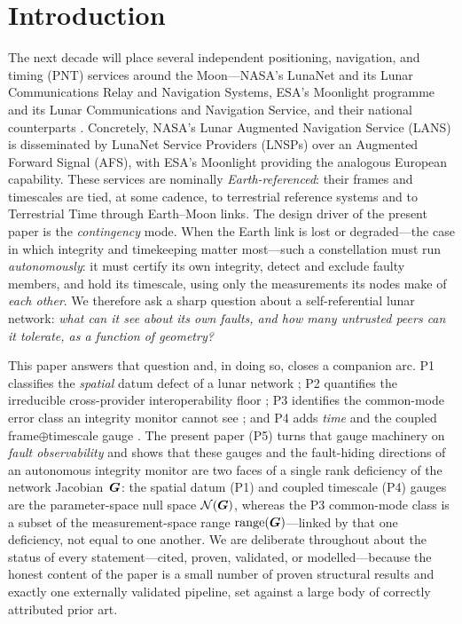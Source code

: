 \section{Introduction}
\label{sec:intro}

The next decade will place several independent positioning, navigation, and timing (PNT)
services around the Moon---NASA's LunaNet and its Lunar Communications Relay and Navigation
Systems, ESA's Moonlight programme and its Lunar Communications and Navigation Service, and
their national counterparts \citep{israel2020lunanet,fienga2024moonlight,lnis2023}. Concretely,
NASA's Lunar Augmented Navigation Service (LANS) is disseminated by LunaNet Service Providers
(LNSPs) over an Augmented Forward Signal (AFS), with ESA's Moonlight providing the analogous
European capability. These
services are nominally \emph{Earth-referenced}: their frames and timescales are tied, at
some cadence, to terrestrial reference systems and to Terrestrial Time through Earth--Moon
links. The design driver of the present paper is the \emph{contingency} mode. When the
Earth link is lost or degraded---the case in which integrity and timekeeping matter
most---such a constellation must run \emph{autonomously}: it must certify its own integrity,
detect and exclude faulty members, and hold its timescale, using only the measurements its
nodes make of \emph{each other}. We therefore ask a sharp question about a self-referential
lunar network: \emph{what can it see about its own faults, and how many untrusted peers can
it tolerate, as a function of geometry?}

This paper answers that question and, in doing so, closes a companion arc. P1 classifies the
\emph{spatial} datum defect of a lunar network \citep{baweja2026datum}; P2 quantifies the
irreducible cross-provider interoperability floor \citep{baweja2026interop}; P3 identifies
the common-mode error class an integrity monitor cannot see \citep{baweja2026commonmode};
and P4 adds \emph{time} and the coupled frame$\oplus$timescale gauge \citep{baweja2026gauge}.
The present paper (P5) turns that gauge machinery on \emph{fault observability} and shows
that these gauges and the fault-hiding directions of an autonomous integrity monitor are two
faces of a single rank deficiency of the network Jacobian~$\bm{G}$: the spatial datum (P1) and
coupled timescale (P4) gauges are the parameter-space null space $\mathcal{N}(\bm{G})$, whereas the
P3 common-mode class is a subset of the measurement-space range $\operatorname{range}(\bm{G})$---linked by that
one deficiency, not equal to one another. We are deliberate throughout about the status of every
statement---cited, proven, validated, or modelled---because the honest content of the paper
is a small number of proven structural results and exactly one externally validated pipeline,
set against a large body of correctly attributed prior art.

